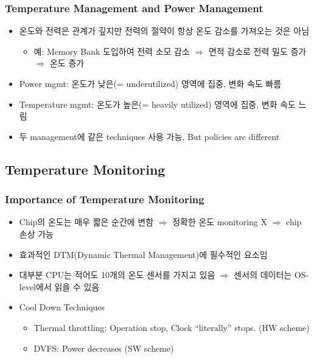 \subsubsection*{Temperature Management and Power Management}
\begin{itemize}
    \item 온도와 전력은 관계가 깊지만 전력의 절약이 항상 온도 감소를 가져오는 것은 아님
    \begin{itemize}
        \item 예: Memory Bank 도입하여 전력 소모 감소 $\Rightarrow$ 면적 감소로 전력 밀도 증가 $\Rightarrow$ 온도 증가
    \end{itemize}
    \item Power mgmt: 온도가 낮은(= underutilized) 영역에 집중, 변화 속도 빠름
    \item Temperature mgmt: 온도가 높은(= heavily utilized) 영역에 집중, 변화 속도 느림
    \item 두 management에 같은 techniques 사용 가능, But policies are different
\end{itemize}

\subsection{Temperature Monitoring}

\subsubsection*{Importance of Temperature Monitoring}
\begin{itemize}
    \item Chip의 온도는 매우 짧은 순간에 변함 $\Rightarrow$ 정확한 온도 monitoring X $\Rightarrow$ chip 손상 가능
    \item 효과적인 DTM(Dynamic Thermal Management)에 필수적인 요소임
    \item 대부분 CPU는 적어도 10개의 온도 센서를 가지고 있음 $\Rightarrow$ 센서의 데이터는 OS-level에서 읽을 수 있음
    \item Cool Down Techniques
    \begin{itemize}
        \item Thermal throttling: Operation stop, Clock ``literally'' stops. (HW scheme)
        \item DVFS: Power decreases (SW scheme)
    \end{itemize}
\end{itemize}
\newpage


